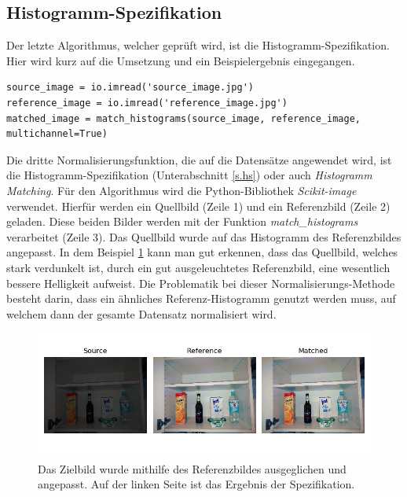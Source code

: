 \subsection{Histogramm-Spezifikation}
Der letzte Algorithmus, welcher geprüft wird, ist die Histogramm-Spezifikation. Hier wird kurz auf die Umsetzung und ein Beispielergebnis eingegangen.\\
\begin{lstlisting}
source_image = io.imread('source_image.jpg')
reference_image = io.imread('reference_image.jpg')
matched_image = match_histograms(source_image, reference_image, multichannel=True)
\end{lstlisting}
Die dritte Normalisierungsfunktion, die auf die Datensätze angewendet wird, ist die Histogramm-Spezifikation (Unterabschnitt \ref{s.hs}) oder auch \textit{Histogramm Matching}. Für den Algorithmus wird die Python-Bibliothek \textit{Scikit-image} verwendet. Hierfür werden ein Quellbild (Zeile 1) und ein Referenzbild (Zeile 2) geladen. Diese beiden Bilder werden mit der Funktion \textit{match\_histograms} verarbeitet (Zeile 3). Das Quellbild wurde auf das Histogramm des Referenzbildes angepasst. In dem Beispiel \ref{img:histogramspez} kann man gut erkennen, dass das Quellbild, welches stark verdunkelt ist, durch ein gut ausgeleuchtetes Referenzbild, eine wesentlich bessere Helligkeit aufweist. Die Problematik bei dieser Normalisierungs-Methode besteht darin, dass ein ähnliches Referenz-Histogramm genutzt werden muss, auf welchem dann der gesamte Datensatz normalisiert wird.
\begin{figure}
	[h]
	\centering
	\includegraphics[scale=0.6]{Sources/HS_beispiel.png}
	\caption{Das Zielbild wurde mithilfe des Referenzbildes ausgeglichen und angepasst. Auf der linken Seite ist das Ergebnis der Spezifikation.}
	\label{img:histogramspez}
\end{figure}